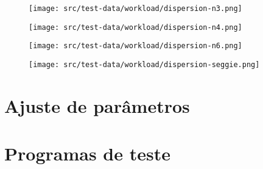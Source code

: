 \begin{figure}[htp]
\centering
\texttt{[image: src/test-data/workload/dispersion-n3.png]}
\label{fig:appdispn3}
\end{figure}

\begin{figure}[htp]
\centering
\texttt{[image: src/test-data/workload/dispersion-n4.png]}
\label{fig:appdispn4}
\end{figure}

\begin{figure}[htp]
\centering
\texttt{[image: src/test-data/workload/dispersion-n6.png]}
\label{fig:appdispn6}
\end{figure}

\begin{figure}[htp]
\centering
\texttt{[image: src/test-data/workload/dispersion-seggie.png]}
\label{fig:appdispseggie}
\end{figure}

\chapter{Ajuste de parâmetros}


\chapter{Programas de teste}\label{chap:programasteste}

\lstset{showspaces=false, frame=single, basicstyle=\scriptsize}

\begin{figure}[htp]
\begin{espacosimples}

\end{espacosimples}
\end{figure}

\begin{figure}[htp]
\begin{espacosimples}

\end{espacosimples}
\end{figure}
